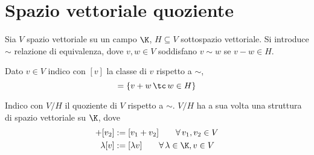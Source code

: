 \section{Spazio vettoriale quoziente}
Sia
$ V $ spazio vettoriale su un campo $ \K $, $ H \subseteq V $ sottospazio vettoriale. Si introduce $ \sim $ relazione di equivalenza, dove $ v, w \in V $ soddisfano $ v\sim w $ se $ v-w \in H $. %


Dato $ v \in V $ indico con $ [v] $ la classe di $ v $ rispetto a $ \sim $, \begin{equation}
    [v]=\{v+w\,\tc\, w \in H\}%
\end{equation}

Indico con $ V/H $ il quoziente di $ V $ rispetto a $ \sim $. $ V/H $ ha a sua volta una struttura di spazio vettoriale su $ \K $, dove \begin{align*}
    [v_1]+[v_2]&:= [v_1+v_2]\qquad \forall\,v_1, v_2 \in V\\
    \lambda[v]&:= [\lambda v]\qquad \forall\, \lambda \in \K, v \in V
\end{align*}



